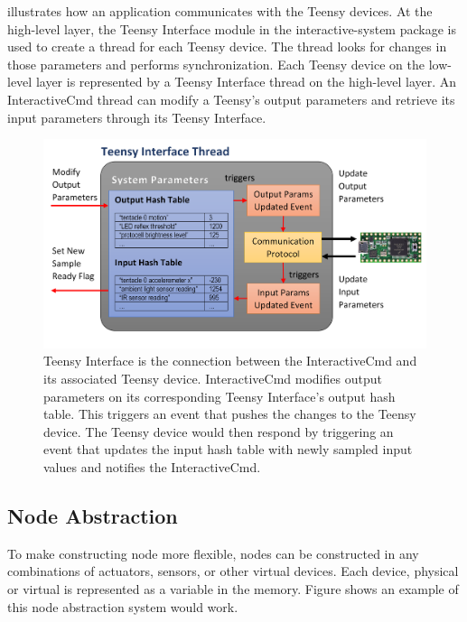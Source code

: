  illustrates how an application communicates with the Teensy devices. At the high-level layer, the Teensy Interface module in the interactive-system package is used to create a thread for each Teensy device. The thread looks for changes in those parameters and performs synchronization. Each Teensy device on the low-level layer is represented by a Teensy Interface thread on the high-level layer. An InteractiveCmd thread can modify a Teensy’s output parameters and retrieve its input parameters through its Teensy Interface.

\begin{figure}[!htbp]
	\centering
	\includegraphics[width=1.0 \textwidth]{"fig/interactive control system/Teensy Interface Thread"}
	\caption[Illustration of the working of the Teensy Interface]{Teensy Interface is the connection between the InteractiveCmd and its associated Teensy device. InteractiveCmd modifies output parameters on its corresponding Teensy Interface's output hash table. This triggers an event that pushes the changes to the Teensy device. The Teensy device would then respond by triggering an event that updates the input hash table with newly sampled input values and notifies the InteractiveCmd.}
	\label{fig:Teensy Interface Thread}
\end{figure}

\FloatBarrier
\subsection{Node Abstraction}

To make constructing node more flexible, nodes can be constructed in any combinations of actuators, sensors, or other virtual devices. Each device, physical or virtual is represented as a variable in the memory. Figure shows an example of this node abstraction system would work.

